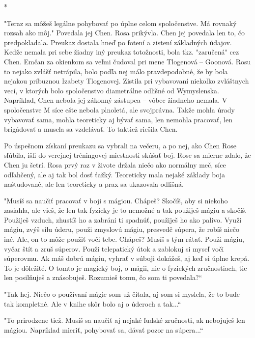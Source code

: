 \documentclass{book}
\begin{document}
\begin{center}
*
\end{center}

"$ $Teraz sa môžeš legálne pohybovať po úplne celom spoločenstve. Má rovnaký rozsah ako môj."$ $ Povedala jej Chen. Rosa prikývla. Chen jej povedala len to, čo predpokladala. Preukaz dostala hneď po fotení a zistení základných údajov. Keďže nemala pri sebe žiadny iný preukaz totožnosti, bola tkz. "$ $zaručená"$ $ cez Chen. Emčan za okienkom sa veľmi čudoval pri mene Tlogenová – Goonová. Rosu to nejako zvlášť netrápila, bolo podľa nej málo pravdepodobné, že by bola nejakou príbuznou Izabety Tlogenovej. Zistila pri vybavovaní niekoľko zvláštnych vecí, v ktorých bolo spoločenstvo diametrálne odlišné od Wymyslenska. Napríklad, Chen nebola jej zákonný zástupca – vôbec žiadneho nemala. V spoločenstve M síce ešte nebola plnoletá, ale svojprávna. Takže mohla úrady vybavovať sama, mohla teoreticky aj bývať sama, len nemohla pracovať, len brigádovať a musela sa vzdelávať. To taktiež riešila Chen.

Po úspešnom získaní preukazu sa vybrali na večeru, a po nej, ako Chen Rose sľúbila, išli do verejnej tréningovej miestnosti skúšať boj. Rose sa mierne zdalo, že Chen ju šetrí. Rosa prvý raz v živote držala niečo ako normálny meč, síce odľahčený, ale aj tak bol dosť ťažký. Teoreticky mala nejaké základy boja naštudované, ale len teoreticky a prax sa ukazovala odlišná.

"$ $Musíš sa naučiť pracovať v boji s mágiou. Chápeš? Skočíš, aby si niekoho zasiahla, ale vieš, že len tak fyzicky je to nemožné a tak použiješ mágiu a skočíš. Použiješ vzduch, zhustíš ho a zabráni ti spadnúť, použiješ ho ako palivo. Využi mágiu, zvýš silu úderu, použi zmyslovú mágiu, presvedč súpera, že robíš niečo iné. Ale, on to môže použiť voči tebe. Chápeš? Musíš s tým rátať. Použi mágiu, vyčar štít a zruš súperov. Použi telepatický útok a zablokuj si myseľ voči súperovmu. Ak máš dobrú mágiu, vyhrať v súboji dokážeš, aj keď si úplne krepá. To je dôležité. O tomto je magický boj, o mágii, nie o fyzických zručnostiach, tie len posilňuješ a znásobuješ. Rozumieš tomu, čo som ti povedala?“

"$ $Tak hej. Niečo o používaní mágie som už čítala, aj som si myslela, že to bude tak kompletné. Ale v knihe skôr bolo aj o úderoch a tak...“

"$ $To prirodzene tiež. Musíš sa naučiť aj nejaké ľudské zručnosti, ak nebojuješ len mágiou. Napríklad mieriť, pohybovať sa, dávať pozor na súpera...“
\end{document}

